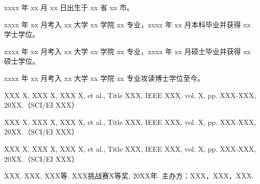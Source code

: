 \begin{resume}


  xxxx 年 xx 月 xx 日出生于 xx 省 xx 市。

  xxxx 年 xx 月考入 xx 大学 xx 学院 xx 专业，xxxx 年 xx 月本科毕业并获得 xx 学士学位。
  
  xxxx 年 xx 月考入 xx 大学 xx 学院 xx 专业，xxxx 年 xx 月硕士毕业并获得 xx 硕士学位。

  xxxx 年 xx 月考入 xx 大学 xx 学院 xx 专业攻读博士学位至今。


  \begin{publications}
    \item XXX X, XXX X, XXX X, et al., Title XXX, IEEE XXX, vol. X, pp. XXX-XXX, 20XX.（SCI/EI XXX）
  \end{publications}

  \begin{publications}[before=\publicationskip,after=\publicationskip]
    \item XXX X, XXX X, XXX X, et al., Title XXX, IEEE XXX, vol. X, pp. XXX-XXX, 20XX.（SCI/EI XXX）
  \end{publications}

  \begin{publications}
    \item XXX X, XXX X, XXX X, et al., Title XXX, IEEE XXX, vol. X, pp. XXX-XXX, 20XX.（SCI/EI XXX）
  \end{publications}

  \begin{achievements}
    \item XXX, XXX, XXX等. XXX挑战赛X等奖, 20XX年. 主办方：XXX，XXX，XXX.

  \end{achievements}

\end{resume}
